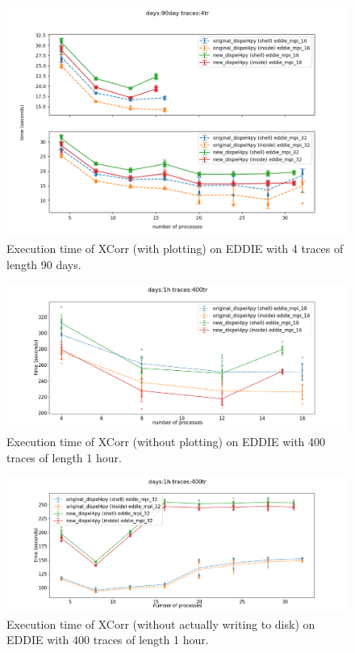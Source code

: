 \begin{figure}[h]
\centering
    \includegraphics[width=1.10\textwidth]{figures/xcorr_eddie_90day_4tr}
\caption{Execution time of XCorr (with plotting) on EDDIE with 4 traces of length 90 days.}
\label{fig:xcorr_eddie}
\end{figure}

\begin{figure}[h]
\centering
    \includegraphics[width=1\textwidth]{figures/xcorr_noplot_eddie_1h_400tr}
\caption{Execution time of XCorr (without plotting) on EDDIE with 400 traces of length 1 hour.}
\label{fig:xcorr_eddie_400}
\end{figure}

\begin{figure}[h]
\centering
    \includegraphics[width=1\textwidth]{figures/xcorr_dummy_eddie_1h_400tr}
\caption{Execution time of XCorr (without actually writing to disk) on EDDIE with 400 traces of length 1 hour.}
\label{fig:xcorr_eddie_400_dummy}
\end{figure}

